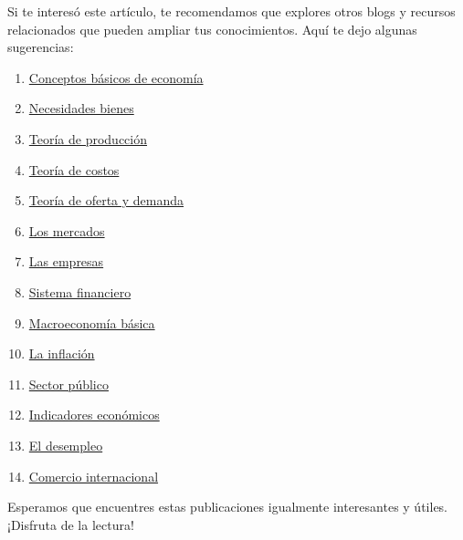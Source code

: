\documentclass[
  a4paper,
]{article}
\begin{document}
Si te interesó este artículo, te recomendamos que explores otros blogs y
recursos relacionados que pueden ampliar tus conocimientos. Aquí te dejo
algunas sugerencias:

\begin{enumerate}
\def\labelenumi{\arabic{enumi}.}
\item
  \href{../2014-01-01-01-conceptos-basicos-de-economia/index.qmd}{Conceptos
  básicos de economía}
\item
  \href{../2014-01-07-02-necesidades-bienes/index.qmd}{Necesidades
  bienes}
\item
  \href{../2014-01-14-03-teoria-produccion/index.qmd}{Teoría de
  producción}
\item
  \href{../2014-01-21-04-teoria-costos/index.qmd}{Teoría de costos}
\item
  \href{../2014-01-28-05-teoria-oferta-demanda/index.qmd}{Teoría de
  oferta y demanda}
\item
  \href{../2014-02-04-06-mercados/index.qmd}{Los mercados}
\item
  \href{../2014-02-11-07-empresas/index.qmd}{Las empresas}
\item
  \href{../2014-02-18-08-sistema-financiero/index.qmd}{Sistema
  financiero}
\item
  \href{../2014-02-25-09-macroeconomia-basica/index.qmd}{Macroeconomía
  básica}
\item
  \href{../2014-03-01-10-inflacion/index.qmd}{La inflación}
\item
  \href{../2014-03-08-11-sector-publico/index.qmd}{Sector público}
\item
  \href{../2014-03-15-12-indicadores-economicos/index.qmd}{Indicadores
  económicos}
\item
  \href{../2014-03-22-13-desempleo/index.qmd}{El desempleo}
\item
  \href{../2014-03-29-14-comercio-internacional/index.qmd}{Comercio
  internacional}
\end{enumerate}

Esperamos que encuentres estas publicaciones igualmente interesantes y
útiles. ¡Disfruta de la lectura!


\printbibliography
\end{document}
